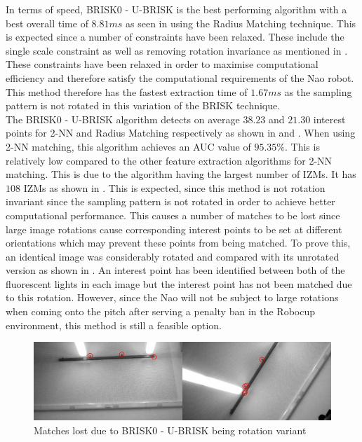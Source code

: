 \documentclass[11pt]{report}
\begin{document}
In terms of speed, BRISK0 - U-BRISK is the best performing algorithm with a best overall time of $8.81 ms$ as seen in  using the Radius Matching technique.  This is expected since a number of constraints have been relaxed. These include the single scale constraint as well as removing rotation invariance as mentioned in . These constraints have been relaxed in order to maximise computational efficiency and therefore satisfy the computational requirements of the Nao robot. This method therefore has the fastest extraction time of $1.67 ms$ as the sampling pattern is not rotated in this variation of the BRISK technique. \\

The BRISK0 - U-BRISK algorithm detects on average $38.23$ and $21.30$ interest points for 2-NN and Radius Matching respectively as shown in  and . When using 2-NN matching, this algorithm achieves an AUC value of $95.35\%$. This is relatively low compared to the other feature extraction algorithms for 2-NN matching. This is due to the algorithm having the largest number of IZMs. It has $108$ IZMs as shown in . This is expected, since this method is not rotation invariant since the sampling pattern is not rotated in order to achieve better computational performance. This causes a number of matches to be lost since large image rotations cause corresponding interest points to be set at different orientations which may prevent these points from being matched. To prove this, an identical image was considerably rotated and compared with its unrotated version as shown in . An interest point has been identified between both of the fluorescent lights in each image but the interest point has not been matched due to this rotation. However, since the Nao will not be subject to large rotations when coming onto the pitch after serving a penalty ban in the Robocup environment, this method is still a feasible option. \\

\begin{figure}
  \centering
    \includegraphics[width=1.0\textwidth]{../Drawings/Matching/rotationsUBRISK.jpg}
    \caption{Matches lost due to BRISK0 - U-BRISK being rotation variant} 
    \label{fig:rotationUbrisk}
\end{figure}
\end{document}
